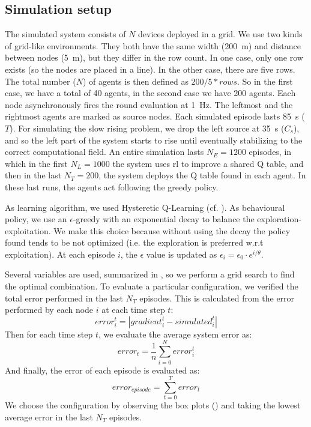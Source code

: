 \subsection{Simulation setup}

The simulated system consists of $N$ devices deployed in a grid. 
%
We use two kinds of grid-like environments. 
%
They both have the same width (\SI{200}{\metre}) and distance between nodes (\SI{5}{\metre}), but they differ in the row count. 
%
In one case, only one row exists (so the nodes are placed in a line). 
%
In the other case, there are five rows. 
%
The total number ($N$) of agents is then defined as $ 200 / 5 * rows $. 
%
So in the first case, we have a total of 40 agents, in the second case we have 200 agents. 
%
Each node asynchronously fires the round evaluation at \SI{1}{\hertz}.
%
The leftmost and the rightmost agents are marked as source nodes. 
%
Each simulated episode lasts \SI{85}{\second} ($T$).
%
For simulating the slow rising problem, we drop the left source at \SI{35}{\second} ($C_s$), and so the left part of the system starts to rise until eventually stabilizing to the correct computational field.
%
An entire simulation lasts $N_E = 1200$ episodes, in which in the first $N_L = 1000$ the system uses \ac{rl} to improve a shared Q table, and then in the last $N_T = 200$, the system deploys the Q table found in each agent. 
%
In these last runs, the agents act following the greedy policy.

As learning algorithm, we used Hysteretic Q-Learning (cf. ). %
%
As behavioural policy, we use an $\epsilon$-greedy with an exponential decay to balance the exploration-exploitation.
%
We make this choice because without using the decay the policy found tends to be not optimized (i.e. the exploration is preferred w.r.t exploitation).
%
At each episode $i$, the $\epsilon$ value is updated as $\epsilon_i = \epsilon_0 \cdot e^{{i} / \theta}$.

Several variables are used, summarized in , so we perform a grid search to find the optimal combination.
%
To evaluate a particular configuration, we verified the total error performed in the last $N_T$ episodes.
%
This is calculated from the error performed by each node $i$ at each time step $t$:
\begin{equation}
error_i^{t} = |gradient_i^{t} - simulated_i^t|
\end{equation}
Then for each time step $t$, we evaluate the average system error as:
\begin{equation}
error_{t} = \frac{1}{n}\sum_{i = 0}^N error_i^t
\end{equation}
And finally, the error of each episode is evaluated as:
\begin{equation}
error_{episode} = \sum_{t = 0}^T error_{t}
\end{equation}
We choose the configuration by observing the box plots () and taking the lowest average error in the last $N_T$ episodes.

